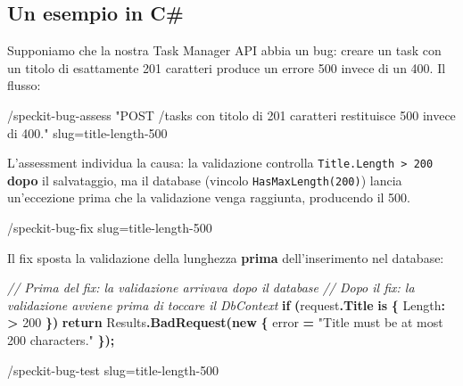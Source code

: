 \documentclass[
  italian,
  10pt,
]{book}
\newenvironment{Shaded}{\begin{snugshade}}{\end{snugshade}}
\newcommand{\CommentTok}[1]{\textcolor[rgb]{0.56,0.35,0.01}{\textit{#1}}}
\newcommand{\DecValTok}[1]{\textcolor[rgb]{0.00,0.00,0.81}{#1}}
\newcommand{\FunctionTok}[1]{\textcolor[rgb]{0.13,0.29,0.53}{\textbf{#1}}}
\newcommand{\KeywordTok}[1]{\textcolor[rgb]{0.13,0.29,0.53}{\textbf{#1}}}
\newcommand{\NormalTok}[1]{#1}
\newcommand{\OperatorTok}[1]{\textcolor[rgb]{0.81,0.36,0.00}{\textbf{#1}}}
\newcommand{\StringTok}[1]{\textcolor[rgb]{0.31,0.60,0.02}{#1}}
\begin{document}
\subsection{Un esempio in C\#}\label{un-esempio-in-c}

Supponiamo che la nostra Task Manager API abbia un bug: creare un task
con un titolo di esattamente 201 caratteri produce un errore 500 invece
di un 400. Il flusso:

\begin{Shaded}
\begin{Highlighting}[]
\NormalTok{/speckit{-}bug{-}assess "POST /tasks con titolo di 201 caratteri restituisce 500}
\NormalTok{invece di 400." slug=title{-}length{-}500}
\end{Highlighting}
\end{Shaded}

L'assessment individua la causa: la validazione controlla
\texttt{Title.Length\ \textgreater{}\ 200} \textbf{dopo} il salvataggio,
ma il database (vincolo \texttt{HasMaxLength(200)}) lancia un'eccezione
prima che la validazione venga raggiunta, producendo il 500.

\begin{Shaded}
\begin{Highlighting}[]
\NormalTok{/speckit{-}bug{-}fix slug=title{-}length{-}500}
\end{Highlighting}
\end{Shaded}

Il fix sposta la validazione della lunghezza \textbf{prima}
dell'inserimento nel database:

\begin{Shaded}
\begin{Highlighting}[]
\CommentTok{// Prima del fix: la validazione arrivava dopo il database}
\CommentTok{// Dopo il fix: la validazione avviene prima di toccare il DbContext}
\KeywordTok{if} \OperatorTok{(}\NormalTok{request}\OperatorTok{.}\FunctionTok{Title} \KeywordTok{is} \OperatorTok{\{}\NormalTok{ Length}\OperatorTok{:} \OperatorTok{\textgreater{}} \DecValTok{200} \OperatorTok{\})}
    \KeywordTok{return}\NormalTok{ Results}\OperatorTok{.}\FunctionTok{BadRequest}\OperatorTok{(}\KeywordTok{new} \OperatorTok{\{}\NormalTok{ error }\OperatorTok{=} \StringTok{"Title must be at most 200 characters."} \OperatorTok{\});}
\end{Highlighting}
\end{Shaded}

\begin{Shaded}
\begin{Highlighting}[]
\NormalTok{/speckit{-}bug{-}test slug=title{-}length{-}500}
\end{Highlighting}
\end{Shaded}
\end{document}
